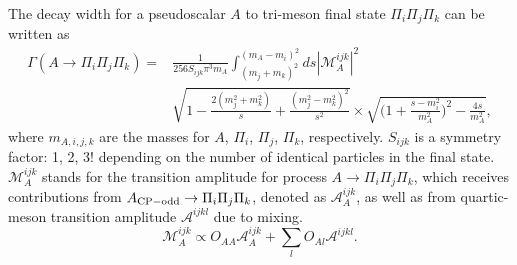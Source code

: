\documentclass[letterpaper,11pt]{article}
\begin{document}
{The decay width for a pseudoscalar $A$ to tri-meson final state $\Pi_i\Pi_j\Pi_k$  can be written as
\begin{equation}
\begin{aligned}
    \Gamma(A\to \Pi_i\Pi_j\Pi_k)=&\frac{1}{256S_{ijk}\pi^3m_A}\int_{(m_j+m_k)^2}^{(m_A-m_i)^2}ds  |\mathcal{M}_A^{ijk}|^2\\ &\sqrt{1-\frac{2(m_j^2+m_k^2)}{s}+\frac{(m_j^2-m_k^2)^2}{s^2}}\times\sqrt{\biggl(1+\frac{s-m_i^2}{m_A^2}\biggr)^2-\frac{4s}{m_A^2}},
\end{aligned}
\end{equation}
where $m_{A,i,j,k}$ are the masses for $A$, $\Pi_i$, $\Pi_j$, $\Pi_k$, respectively. $S_{ijk}$ is a symmetry factor: 1, 2, $3!$ depending on the number of identical particles in the final state. $\mathcal{M}_A^{ijk}$ stands for the transition amplitude for process $A\to \Pi_i\Pi_j\Pi_k$,  which receives contributions   from $A_{\rm CP-odd}\to \Pi_i\Pi_j\Pi_k$, denoted as $\mathcal{A}_A^{ijk}$, as well as from quartic-meson transition amplitude  $\mathcal{A}^{ijkl}$ due to mixing.   
\begin{equation}
\mathcal{M}_A^{ijk}\propto  O_{AA}\mathcal{A}_A^{ijk} + \sum_l O_{Al}\mathcal{A}^{ijkl}.
\end{equation}

}
\end{document}
